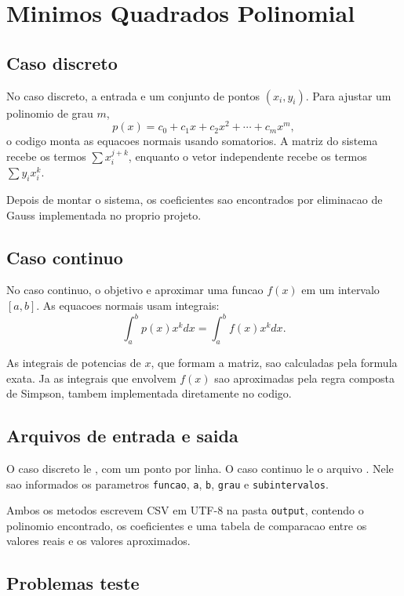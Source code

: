 \documentclass[../main.tex]{subfiles}
\begin{document}
\section{Minimos Quadrados Polinomial}

\subsection{Caso discreto}

No caso discreto, a entrada e um conjunto de pontos \((x_i, y_i)\). Para ajustar
um polinomio de grau \(m\),
\[
    p(x) = c_0 + c_1x + c_2x^2 + \cdots + c_mx^m,
\]
o codigo monta as equacoes normais usando somatorios. A matriz do sistema recebe
os termos \(\sum x_i^{j+k}\), enquanto o vetor independente recebe os termos
\(\sum y_i x_i^k\).

Depois de montar o sistema, os coeficientes sao encontrados por eliminacao de
Gauss implementada no proprio projeto.

\subsection{Caso continuo}

No caso continuo, o objetivo e aproximar uma funcao \(f(x)\) em um intervalo
\([a,b]\). As equacoes normais usam integrais:
\[
    \int_a^b p(x)x^k dx = \int_a^b f(x)x^k dx.
\]

As integrais de potencias de \(x\), que formam a matriz, sao calculadas pela
formula exata. Ja as integrais que envolvem \(f(x)\) sao aproximadas pela regra
composta de Simpson, tambem implementada diretamente no codigo.

\subsection{Arquivos de entrada e saida}

O caso discreto le , com um ponto por linha. O caso
continuo le o arquivo . Nele sao informados os
parametros \texttt{funcao}, \texttt{a}, \texttt{b}, \texttt{grau} e
\texttt{subintervalos}.

Ambos os metodos escrevem CSV em UTF-8 na pasta \texttt{output}, contendo o polinomio
encontrado, os coeficientes e uma tabela de comparacao entre os valores reais e
os valores aproximados.

\subsection{Problemas teste}
\end{document}
